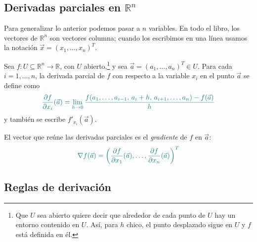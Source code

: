 \documentclass{article}
\newcommand{\vect}[1]{\vec{#1}}
\begin{document}
\begin{center}
\end{center}



\subsection*{Derivadas parciales en \(\mathbb{R}^n\)}
Para generalizar lo anterior podemos pasar a \(n\) variables. En todo el libro, los vectores de \(\mathbb{R}^n\) son vectores columna; cuando los escribimos en una línea usamos la notación \(\vect{x}=(x_1,\dots,x_n)^T\).

Sea \(f\colon U\subseteq\mathbb{R}^n\to\mathbb{R}\), con \(U\) abierto,\footnote{Que \(U\) sea abierto quiere decir que alrededor de cada punto de \(U\) hay un entorno contenido en \(U\). Así, para \(h\) chico, el punto desplazado sigue en \(U\) y \(f\) está definida en él.} y sea \(\vect{a}=(a_1,\dots,a_n)^T\in U\). Para cada \(i=1,\dots,n\), la derivada parcial de \(f\) con respecto a la variable \(x_i\) en el punto \(\vect{a}\) se define como
\[
\color{teal}
\frac{\partial f}{\partial x_i}(\vect{a})
=
\lim_{h\to0}
\frac{f(a_1,\dots,a_{i-1},\,a_i+h,\,a_{i+1},\dots,a_n)-f(\vect{a})}{h}
\]
y también se escribe \(f'_{x_i}(\vect{a})\).

El vector que reúne las derivadas parciales es el \emph{gradiente} de \(f\) en \(\vect{a}\):
\[
\color{teal}
\nabla f(\vect{a})=\left(\frac{\partial f}{\partial x_1}(\vect{a}),\dots,\frac{\partial f}{\partial x_n}(\vect{a})\right)^{T}
\]



\subsection*{Reglas de derivación}
\end{document}
